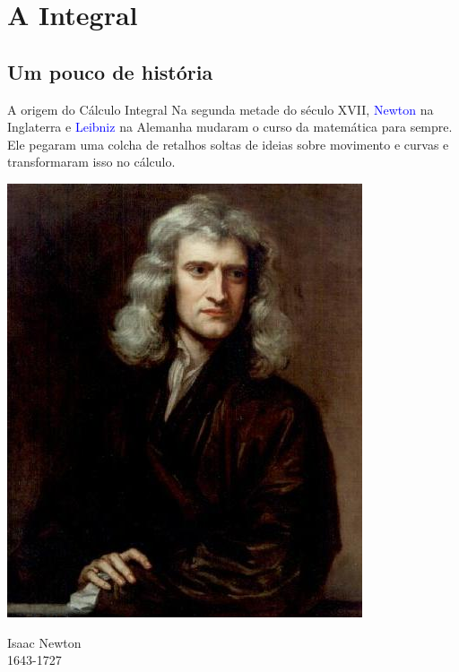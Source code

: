 \section{A Integral}

\subsection*{Um pouco de história}

\begin{frame}[label=area-circulo]{A origem do Cálculo Integral}
	Na segunda metade do século XVII, \textcolor{blue}{Newton} na Inglaterra e \textcolor{blue}{Leibniz} na Alemanha mudaram o curso da matemática para sempre. Ele pegaram uma colcha de retalhos soltas de ideias sobre movimento e curvas e transformaram isso no cálculo. 


	\begin{center}
				\begin{minipage}{0.4\textwidth}
\begin{center}
\includegraphics[scale=0.35]{newton.jpg}

{\scriptsize 	Isaac Newton\\ 1643-1727 }
\end{center}
	\end{minipage}	
	\begin{minipage}{0.4\textwidth}
		

\end{minipage}
\end{center}
\end{frame}
